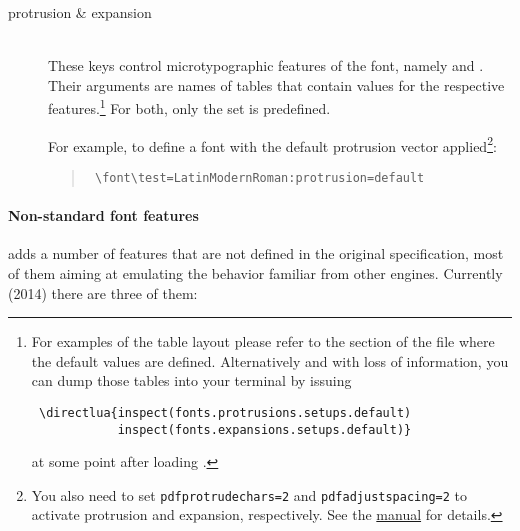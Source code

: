 \begin{description}
\item [protrusion \& expansion] \hfill \\
       These keys control microtypographic features of the font,
       namely  and .
       Their arguments are names of \LUA tables that contain
       values for the respective features.\footnote{%
          For examples of the table layout please refer to the
          section of the file  where the
          default values are defined.
          Alternatively and with loss of information, you can dump
          those tables into your terminal by issuing
          \begin{verbatim}
 \directlua{inspect(fonts.protrusions.setups.default)
            inspect(fonts.expansions.setups.default)}
          \end{verbatim}
          at some point after loading .
       }
       For both, only the set  is predefined.

       For example, to define a font with the default
       protrusion vector applied\footnote{%
         You also need to set
             \verb|pdfprotrudechars=2| and
             \verb|pdfadjustspacing=2|
         to activate protrusion and expansion, respectively.
         See the
         \href{http://mirrors.ctan.org/systems/pdftex/manual/pdftex-a.pdf}%
              {\PDFTEX manual}
         for details.
       }:

       \begin{quote}
          \begin{verbatim}
 \font\test=LatinModernRoman:protrusion=default
          \end{verbatim}
       \end{quote}
\end{description}

\paragraph{Non-standard font features}
 adds a number of features that are not defined
in the original \OpenType specification, most of them
aiming at emulating the behavior familiar from other \TEX engines.
%
Currently (2014) there are three of them:

